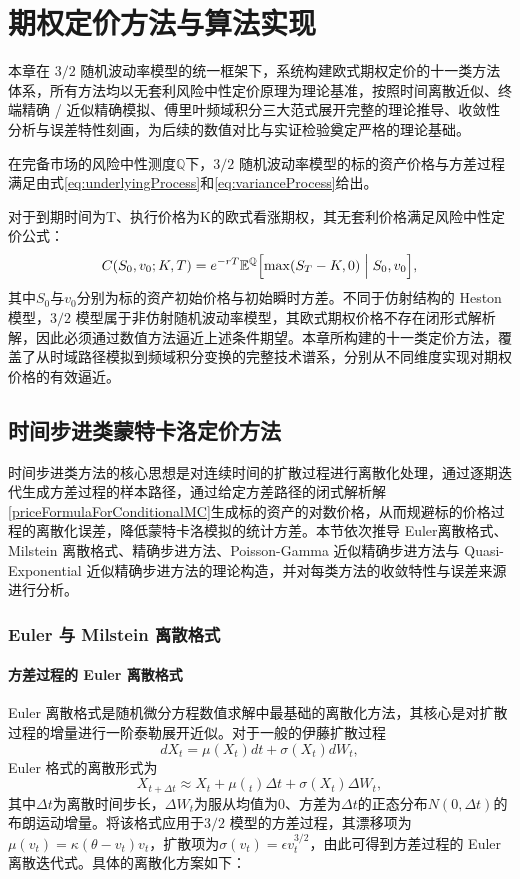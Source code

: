 \chapter{期权定价方法与算法实现}

本章在 $3/2$ 随机波动率模型的统一框架下，系统构建欧式期权定价的十一类方法体系，所有方法均以无套利风险中性定价原理为理论基准，按照时间离散近似、终端精确 / 近似精确模拟、傅里叶频域积分三大范式展开完整的理论推导、收敛性分析与误差特性刻画，为后续的数值对比与实证检验奠定严格的理论基础。

在完备市场的风险中性测度$\mathbb{Q}$下，$3/2$ 随机波动率模型的标的资产价格与方差过程满足由式\eqref{eq:underlyingProcess}和\eqref{eq:varianceProcess}给出。

对于到期时间为T、执行价格为K的欧式看涨期权，其无套利价格满足风险中性定价公式：
\begin {equation}
  C (S_0,v_0;K,T) = e^{-rT}\mathbb {E}^{\mathbb {Q}}\Bigl [\max (S_T-K,0)\Bigm| S_0,v_0\Bigr],
\end {equation}
其中$S_0$与$v_0$分别为标的资产初始价格与初始瞬时方差。不同于仿射结构的 Heston 模型，$3/2$ 模型属于非仿射随机波动率模型，其欧式期权价格不存在闭形式解析解，因此必须通过数值方法逼近上述条件期望。本章所构建的十一类定价方法，覆盖了从时域路径模拟到频域积分变换的完整技术谱系，分别从不同维度实现对期权价格的有效逼近。

\section{时间步进类蒙特卡洛定价方法}
时间步进类方法的核心思想是对连续时间的扩散过程进行离散化处理，通过逐期迭代生成方差过程的样本路径，通过给定方差路径的闭式解析解\eqref{priceFormulaForConditionalMC}生成标的资产的对数价格，从而规避标的价格过程的离散化误差，降低蒙特卡洛模拟的统计方差。本节依次推导 Euler离散格式、Milstein 离散格式、精确步进方法、Poisson-Gamma 近似精确步进方法与 Quasi-Exponential 近似精确步进方法的理论构造，并对每类方法的收敛特性与误差来源进行分析。
\subsection{Euler 与 Milstein 离散格式}
\subsubsection{方差过程的 Euler 离散格式}
Euler 离散格式是随机微分方程数值求解中最基础的离散化方法，其核心是对扩散过程的增量进行一阶泰勒展开近似。对于一般的伊藤扩散过程
$$dX_t ​= \mu(X_t​)dt+\sigma(X_t​)dW_t​, $$
Euler 格式的离散形式为
$$ X_{t+\Delta t}​\approx X_t​+\mu(_t​)\Delta t+\sigma (X_t​)\Delta W_t​, $$
其中$\Delta t$为离散时间步长，$\Delta W_t​$为服从均值为0、方差为$\Delta t$的正态分布$N(0,\Delta t)$的布朗运动增量。将该格式应用于$3/2$ 模型的方差过程，其漂移项为$\mu(v_t​)=\kappa(\theta−v_t​)v_t​$，扩散项为$\sigma(v_t​)=\epsilon v_t^{3/2}​$，由此可得到方差过程的 Euler 离散迭代式。具体的离散化方案如下：


